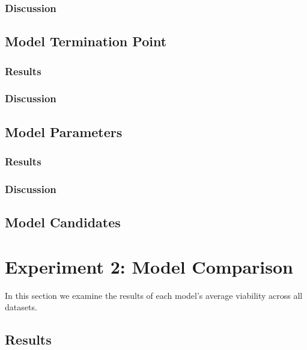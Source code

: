 \documentclass[12pt,a4paper]{report}
\begin{document}
\subsubsection{Discussion}

\subsection{Model Termination Point}
\subsubsection{Results}

\subsubsection{Discussion}

\subsection{Model Parameters}
\subsubsection{Results}

\subsubsection{Discussion}

\subsection{Model Candidates}




\section{Experiment 2: Model Comparison}
\label{sec:overall}
In this section we examine the results of each model's average viability across all datasets. 
\subsection{Results}


\end{document}
